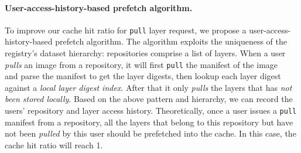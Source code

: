 \paragraph{User-access-history-based prefetch algorithm.}
To improve our cache hit ratio for \texttt{pull} layer request, we propose a user-access-history-based prefetch algorithm. The algorithm
exploits the uniqueness of the registry's 
dataset hierarchy: repositories comprise a list of layers.
When a user \emph{pulls} an image from a repository, it will first \texttt{pull} the manifest of the image~\cite{docker}~\cite{dockerworkload} and 
parse the manifest to get the layer digests,
then lookup each layer digest against a \emph{local layer digest index}.
After that it only \emph{pulls} the layers that has \emph{not been stored locally}.
%
Based on the above 
pattern and hierarchy, we can record the users' repository and layer access history. 
Theoretically, once a user issues a \texttt{pull} manifest from a repository, all the layers that belong to this repository but have not been \emph{pulled} by this user should be prefetched into the cache.
In this case, the cache hit ratio will reach 1.

